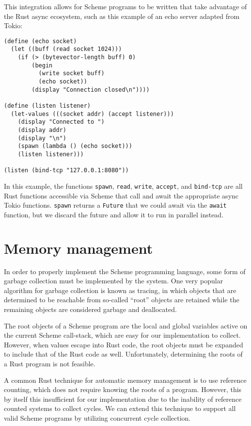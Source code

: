 \documentclass[sigplan,review,anonymous]{acmart}
\begin{document}
This integration allows for Scheme programs to be written that take advantage
of the Rust async ecosystem, such as this example of an echo server adapted
from Tokio\cite{tokio}:

\begin{verbatim}
(define (echo socket)
  (let ((buff (read socket 1024)))
    (if (> (bytevector-length buff) 0)
        (begin
          (write socket buff)
          (echo socket))
        (display "Connection closed\n"))))

(define (listen listener)
  (let-values (((socket addr) (accept listener)))
    (display "Connected to ")
    (display addr)
    (display "\n")
    (spawn (lambda () (echo socket)))
    (listen listener)))

(listen (bind-tcp "127.0.0.1:8080"))
\end{verbatim}

In this example, the functions \texttt{spawn}, \texttt{read}, \texttt{write},
\texttt{accept}, and \texttt{bind-tcp} are all Rust functions accessible via
Scheme that call and await the appropriate async Tokio functions. \texttt{spawn}
returns a \texttt{Future}\cite{future} that we could await via the
\texttt{await} function, but we discard the future and allow it to run in
parallel instead. 

\section{Memory management}

In order to properly implement the Scheme programming language, some form of
garbage collection must be implemented by the system. One very popular algorithm
for garbage collection is known as tracing, in which objects that are determined
to be reachable from so-called ``root'' objects are retained while the remaining
objects are considered garbage and deallocated\cite{lisptracing}.

The root objects of a Scheme program are the local and global variables active on
the current Scheme call-stack, which are easy for our implementation to collect.
However, when values escape into Rust code, the root objects must be expanded to
include that of the Rust code as well. Unfortunately, determining the roots of a
Rust program is not feasible\cite{rusttracing}.

A common Rust technique for automatic memory management is to use reference
counting, which does not require knowing the roots of a program. However, this
by itself this insufficient for our implementation due to the inability of
reference counted systems to collect cycles\cite{rc}. We can extend this
technique to support all valid Scheme programs by utilizing concurrent cycle
collection\cite{cc}.
\end{document}
